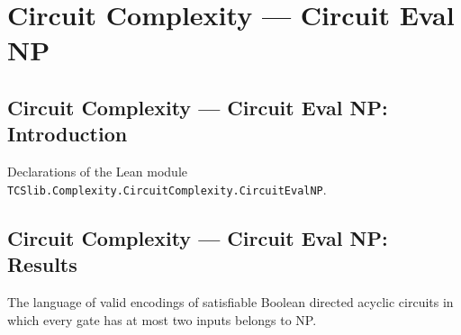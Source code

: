 \section{Circuit Complexity --- Circuit Eval NP}
\subsection*{Circuit Complexity --- Circuit Eval NP: Introduction}

Declarations of the Lean module \texttt{TCSlib.Complexity.CircuitComplexity.CircuitEvalNP}.

\subsection*{Circuit Complexity --- Circuit Eval NP: Results}

\begin{theorem}
\label{BoolCircuit.dagCktSatLang_mem_NP}
\leanok
{}
The language of valid encodings of satisfiable Boolean directed acyclic circuits in
which every gate has at most two inputs belongs to NP.
\end{theorem}
